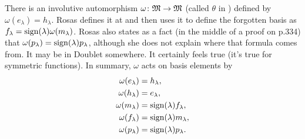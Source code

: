There is an involutive automorphism $\omega\colon\mathfrak{M}\to\mathfrak{M}$ (called $\theta$ in \cite{Doubilet}) defined by $\omega(e_\lambda) = h_\lambda$.  Rosas defines it at \cite[p.328]{Rosas} and then uses it to define the forgotten basis as $f_\lambda=\operatorname{sign}(\lambda)\omega(m_\lambda)$.  Rosas also states as a fact (in the middle of a proof on p.334) that $\omega(p_\lambda)=\operatorname{sign}(\lambda) p_\lambda$, although she does not explain where that formula comes from.  It may be in Doublet somewhere.  It certainly feels true (it's true for symmetric functions).  In summary, $\omega$ acts on basis elements by
\begin{align*}
\omega(e_\lambda) &= h_\lambda,\\
\omega(h_\lambda) &= e_\lambda,\\
\omega(m_\lambda) &= \operatorname{sign}(\lambda)f_\lambda,\\
\omega(f_\lambda) &= \operatorname{sign}(\lambda)m_\lambda,\\
\omega(p_\lambda) &= \operatorname{sign}(\lambda)p_\lambda.
\end{align*}



